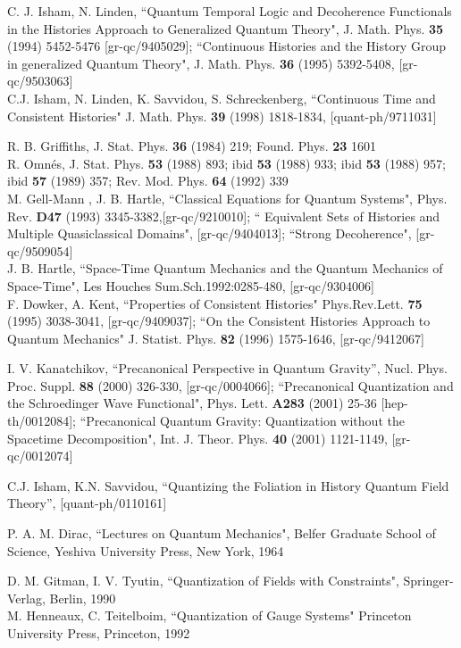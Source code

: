 \documentclass[12pt]{report}
\begin{document}
\begin{thebibliography}{99}
C. J. Isham, N. Linden, ``Quantum Temporal Logic and Decoherence 
Functionals in the Histories Approach to Generalized Quantum Theory",  
J. Math. Phys. {\bf 35} (1994) 5452-5476 [gr-qc/9405029];
``Continuous Histories and the History Group in generalized Quantum Theory",
J. Math. Phys. {\bf 36} (1995) 5392-5408, [gr-qc/9503063]\\
C.J. Isham, N. Linden, K. Savvidou, S. Schreckenberg,
``Continuous Time and Consistent Histories" 
J. Math. Phys. {\bf 39} (1998) 1818-1834, [quant-ph/9711031]

R. B. Griffiths, J. Stat. Phys. {\bf 36} (1984) 219; Found. Phys. 
{\bf 23} 1601\\
R. Omn\'es, J. Stat. Phys. {\bf 53} (1988) 893; ibid {\bf 53} (1988) 933;
ibid {\bf 53} (1988) 957; ibid {\bf 57} (1989) 357; Rev. Mod. Phys. {\bf 64}
(1992) 339\\
M. Gell-Mann , J. B. Hartle, ``Classical Equations for Quantum 
Systems", Phys. Rev. {\bf D47} (1993) 3345-3382,[gr-qc/9210010];
`` Equivalent Sets of Histories and Multiple Quasiclassical Domains",
[gr-qc/9404013]; ``Strong Decoherence", [gr-qc/9509054]\\
J. B. Hartle, ``Space-Time Quantum Mechanics and the Quantum Mechanics of 
Space-Time", Les Houches Sum.Sch.1992:0285-480, [gr-qc/9304006] \\
F. Dowker, A. Kent, ``Properties of Consistent Histories"
Phys.Rev.Lett. {\bf 75} (1995) 3038-3041, [gr-qc/9409037];
``On the Consistent Histories Approach to Quantum Mechanics"
J. Statist. Phys. {\bf 82} (1996) 1575-1646, [gr-qc/9412067]

I. V. Kanatchikov, ``Precanonical Perspective in Quantum Gravity'',
Nucl. Phys. Proc. Suppl. {\bf 88} (2000) 326-330, [gr-qc/0004066];
``Precanonical Quantization and the Schroedinger Wave Functional",
Phys. Lett. {\bf A283} (2001) 25-36 [hep-th/0012084];
``Precanonical Quantum Gravity: Quantization without the Spacetime 
Decomposition", Int. J. Theor. Phys. {\bf 40} (2001) 1121-1149,
[gr-qc/0012074] 

C.J. Isham, K.N. Savvidou, ``Quantizing the Foliation in History Quantum 
Field Theory'', [quant-ph/0110161]

 P. A. M. Dirac, ``Lectures on Quantum Mechanics", Belfer Graduate
School of Science, Yeshiva University Press, New York, 1964

D. M. Gitman, I. V. Tyutin, ``Quantization of Fields with 
Constraints", Springer-Verlag, Berlin, 1990\\
M. Henneaux, C. Teitelboim, ``Quantization of Gauge Systems"
Princeton University Press, Princeton, 1992


\end{thebibliography}
\end{document}
